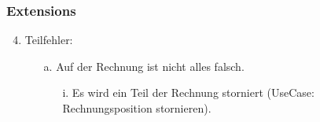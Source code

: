 \documentclass[./detailed_overview_usecases.tex]{subfiles}
\begin{document}
    \subsubsection*{Extensions}
    \begin{enumerate}
        \setcounter{enumi}{3}
        \item Teilfehler:
        \begin{itemize}
            \item[a.] Auf der Rechnung ist nicht alles falsch.
            \begin{itemize}
                \item[i.] Es wird ein Teil der Rechnung storniert (UseCase: Rechnungsposition stornieren).
            \end{itemize}
        \end{itemize}
    \end{enumerate}
\end{document}
